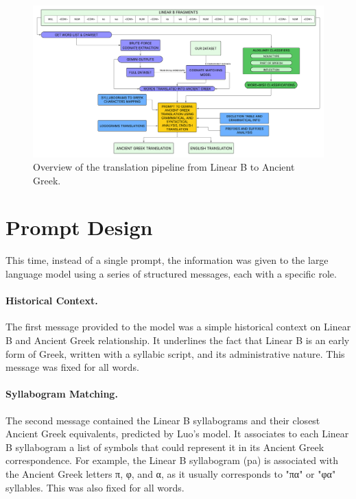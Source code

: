 \begin{figure}[H]
    \begin{adjustbox}{center}
        \includegraphics[width=1.2\textwidth]{Images/pipeline.png}
    \end{adjustbox}
    \caption{Overview of the translation pipeline from Linear B to Ancient Greek.}
    \label{fig:pipeline}
\end{figure}

\section{Prompt Design} \label{sec:final-prompt}
This time, instead of a single prompt, the information was given to the large language model using a series of structured messages, each with a specific role.

\paragraph{Historical Context.}
The first message provided to the model was a simple historical context on Linear B and Ancient Greek relationship.
It underlines the fact that Linear B is an early form of Greek, written with a syllabic script, and its administrative nature.
This message was fixed for all words.

\paragraph{Syllabogram Matching.}
The second message contained the Linear B syllabograms and their closest Ancient Greek equivalents, predicted by Luo's model.
It associates to each Linear B syllabogram a list of symbols that could represent it in its Ancient Greek correspondence.
For example, the Linear B syllabogram \textlinb{\Bpa} (pa) is associated with the Ancient Greek letters \textgreek{π}, \textgreek{φ}, and \textgreek{α}, as it usually corresponds to "\textgreek{πα}" or "\textgreek{φα}" syllables.
This was also fixed for all words.

